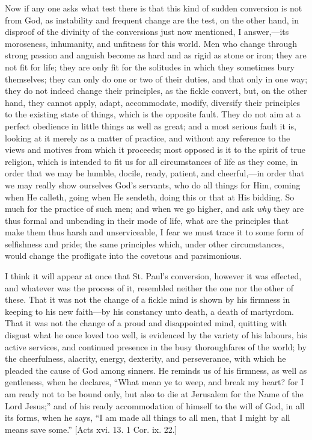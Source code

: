 Now if any one asks what test there is that this kind of sudden
conversion is not from God, as instability and frequent change are the
test, on the other hand, in disproof of the divinity of the
conversions just now mentioned, I answer,—its moroseness,
inhumanity, and unfitness for this world. Men who change through
strong passion and anguish become as hard and as rigid as stone or
iron; they are not fit for life; they are only fit for the solitudes
in which they sometimes bury themselves; they can only do one or two
of their duties, and that only in one way; they do not indeed change
their principles, as the fickle convert, but, on the other hand, they
cannot apply, adapt, accommodate, modify, diversify their principles
to the existing state of things, which is the opposite fault. They do
not aim at a perfect obedience in little things as well as great; and
a most serious fault it is, looking at it merely as a matter of
practice, and without any reference to the views and motives from
which it proceeds; most opposed is it to the spirit of true religion,
which is intended to fit us for all circumstances of life as they
come, in order that we may be humble, docile, ready, patient, and
cheerful,—in order that we may really show ourselves God's servants,
who do all things for Him, coming when He calleth, going when He
sendeth, doing this or that at His bidding. So much for the practice
of such men; and when we go higher, and ask \emph{why} they are thus formal
and unbending in their mode of life, what are the principles that make
them thus harsh and unserviceable, I fear we must trace it to some
form of selfishness and pride; the same principles which, under other
circumstances, would change the profligate into the covetous and
parsimonious.

I think it will appear at once that St. Paul's conversion, however
it was effected, and whatever was the process of it, resembled neither
the one nor the other of these. That it was not the change of a fickle
mind is shown by his firmness in keeping to his new faith—by his
constancy unto death, a death of martyrdom. That it was not the change
of a proud and disappointed mind, quitting with disgust what he once
loved too well, is evidenced by the variety of his labours, his active
services, and continued presence in the busy thoroughfares of the
world; by the cheerfulness, alacrity, energy, dexterity, and
perseverance, with which he pleaded the cause of God among sinners. He
reminds us of his firmness, as well as gentleness, when he declares,
``What mean ye to weep, and break my heart? for I am ready not to
be bound only, but also to die at Jerusalem for the Name of the Lord
Jesus;'' and of his ready accommodation of himself to the will of
God, in all its forms, when he says, ``I am made all things to all
men, that I might by all means save some.'' [Acts xvi. 13. 1 Cor.
ix. 22.]

